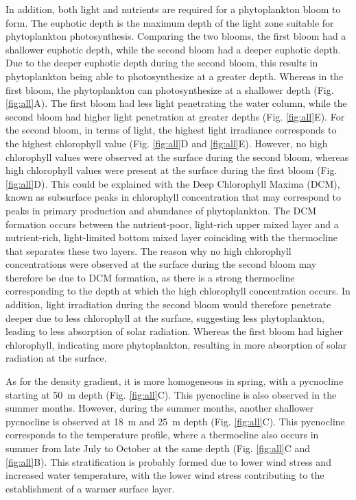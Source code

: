 \documentclass[../Main.tex]{subfiles}
\begin{document}
In addition, both light and nutrients are required for a phytoplankton bloom to form\supercite{munkes2021cyanobacteria}. The euphotic depth is the maximum depth of the light zone suitable for phytoplankton photosynthesis.\supercite{fernand2013contribution} Comparing the two blooms, the first bloom had a shallower euphotic depth, while the second bloom had a deeper euphotic depth. Due to the deeper euphotic depth during the second bloom, this results in phytoplankton being able to photosynthesize at a greater depth. Whereas in the first bloom, the phytoplankton can photosynthesize at a shallower depth  (Fig. \ref{fig:all}A). The first bloom had less light penetrating the water column, while the second bloom had higher light penetration at greater depths (Fig. \ref{fig:all}E). 
For the second bloom, in terms of light, the highest light irradiance corresponds to the highest chlorophyll value (Fig. \ref{fig:all}D and \ref{fig:all}E). 
However, no high chlorophyll values were observed at the surface during the second bloom, whereas high chlorophyll values were present at the surface during the first bloom (Fig. \ref{fig:all}D). This could be explained with the Deep Chlorophyll Maxima (DCM), known as subsurface peaks in chlorophyll concentration that may correspond to peaks in primary production and abundance of phytoplankton. The DCM formation occurs between the nutrient-poor, light-rich upper mixed layer and a nutrient-rich, light-limited bottom mixed layer coinciding with the thermocline that separates these two layers.\supercite{MLD} The reason why no high chlorophyll concentrations were observed at the surface during the second bloom may therefore be due to DCM formation, as there is a strong thermocline corresponding to the depth at which the high chlorophyll concentration occurs. In addition, light irradiation during the second bloom would therefore penetrate deeper due to less chlorophyll at the surface, suggesting less phytoplankton, leading to less absorption of solar radiation. Whereas the first bloom had higher chlorophyll, indicating more phytoplankton, resulting in more absorption of solar radiation at the surface. 

As for the density gradient, it is more homogeneous in spring, with a pycnocline starting at \SI{50}{m} depth (Fig. \ref{fig:all}C). This pycnocline is also observed in the summer months. However, during the summer months, another shallower pycnocline is observed at \SI{18}{m} and \SI{25}{m} depth (Fig. \ref{fig:all}C). This pycnocline corresponds to the temperature profile, where a thermocline also occurs in summer from late July to October at the same depth (Fig. \ref{fig:all}C and \ref{fig:all}B). This stratification is probably formed due to lower wind stress and increased water temperature, with the lower wind stress contributing to the establishment of a warmer surface layer\supercite{carey2012eco}.
\end{document}
